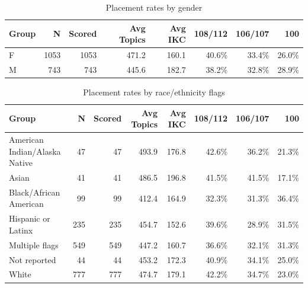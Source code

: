 \documentclass[11pt]{article}
\begin{document}
\begin{table}[htbp]
\centering
\small
\caption{Placement rates by gender}
\begin{tabular}{lrrrrrrr}
\hline
Group & N & Scored & Avg Topics & Avg IKC & 108/112 & 106/107 & 100 \\
\hline
F & 1053 & 1053 & 471.2 & 160.1 & 40.6\% & 33.4\% & 26.0\% \\
M & 743 & 743 & 445.6 & 182.7 & 38.2\% & 32.8\% & 28.9\% \\
\hline
\end{tabular}
\end{table}

\begin{table}[htbp]
\centering
\small
\caption{Placement rates by race/ethnicity flags}
\begin{tabular}{lrrrrrrr}
\hline
Group & N & Scored & Avg Topics & Avg IKC & 108/112 & 106/107 & 100 \\
\hline
American Indian/Alaska Native & 47 & 47 & 493.9 & 176.8 & 42.6\% & 36.2\% & 21.3\% \\
Asian & 41 & 41 & 486.5 & 196.8 & 41.5\% & 41.5\% & 17.1\% \\
Black/African American & 99 & 99 & 412.4 & 164.9 & 32.3\% & 31.3\% & 36.4\% \\
Hispanic or Latinx & 235 & 235 & 454.7 & 152.6 & 39.6\% & 28.9\% & 31.5\% \\
Multiple flags & 549 & 549 & 447.2 & 160.7 & 36.6\% & 32.1\% & 31.3\% \\
Not reported & 44 & 44 & 453.2 & 172.3 & 40.9\% & 34.1\% & 25.0\% \\
White & 777 & 777 & 474.7 & 179.1 & 42.2\% & 34.7\% & 23.0\% \\
\hline
\end{tabular}
\end{table}
\end{document}
